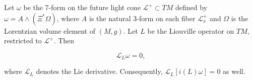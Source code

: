 Let $\omega$ be the 7-form on the future light cone $\mathcal{L}^+ \subset TM$ defined by $\omega = A \wedge (\Xi^* \Omega)$, where $A$ is the natural 3-form on each fiber $\mathcal{L}^+_x$ and $\Omega$ is the Lorentzian volume element of $(M, g)$. Let $L$ be the Liouville operator on $TM$, restricted to $\mathcal{L}^+$. Then

$$\mathcal{L}_L \omega = 0,$$

where $\mathcal{L}_L$ denotes the Lie derivative. Consequently, $\mathcal{L}_L [i(L) \omega] = 0$ as well.
